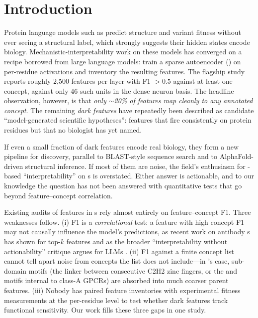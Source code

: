 \section{Introduction}
\label{sec:intro}

Protein language models such as \esm \citep{lin2023esm2} predict structure and variant fitness without ever seeing a structural label, which strongly suggests their hidden states encode biology. Mechanistic-interpretability work on these models has converged on a recipe borrowed from large language models: train a sparse autoencoder (\sae) on per-residue activations and inventory the resulting features. The flagship \interplm study \citep{simon2024interplm} reports roughly 2{,}500 \sae features per layer with F1 $> 0.5$ against at least one \swissprot concept, against only 46 such units in the dense neuron basis. The headline observation, however, is that \emph{only $\sim$20\% of \sae features map cleanly to any annotated concept}. The remaining \emph{dark features} have repeatedly been described as candidate ``model-generated scientific hypotheses'': features that fire consistently on protein residues but that no biologist has yet named.

 If even a small fraction of dark features encode real biology, they form a new pipeline for discovery, parallel to BLAST-style sequence search and to AlphaFold-driven structural inference. If most of them are noise, the field's enthusiasm for \sae-based ``interpretability'' on \plm{}s is overstated. Either answer is actionable, and to our knowledge the question has not been answered with quantitative tests that go beyond feature--concept correlation.

 Existing audits of \sae features in \plm{}s rely almost entirely on feature--concept F1. Three weaknesses follow. (i) F1 is a \emph{correlational} test: a feature with high concept F1 may not causally influence the model's predictions, as recent work on antibody \plm{}s has shown for top-$k$ \sae features \citep{haque2026antibody} and as the broader ``interpretability without actionability'' critique argues for LLMs \citep{bricken2026actionability}. (ii) F1 against a finite concept list cannot tell apart noise from concepts the list does not include---in \swissprot's case, sub-domain motifs (\eg the \tgekp linker between consecutive C2H2 zinc fingers, or the \dry and \npxxy motifs internal to class-A GPCRs) are absorbed into much coarser parent features. (iii) Nobody has paired \sae feature inventories with experimental fitness measurements at the per-residue level to test whether dark features track functional sensitivity. Our work fills these three gaps in one study.

